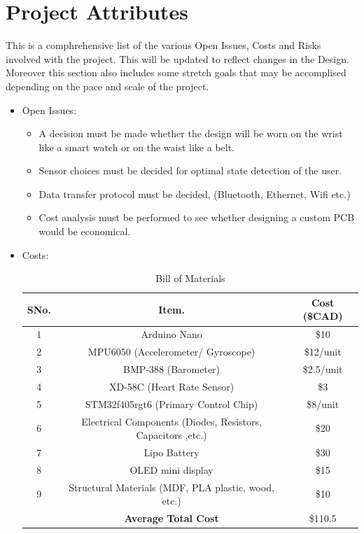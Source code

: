 \documentclass[12pt]{article}
\begin{document}
\section{Project Attributes}
\label{Project_Attr}
This is a comphrehensive list of the various Open Issues, Costs and Risks involved with the project. This will be updated to reflect changes in the Design. Moreover this section also includes some stretch goals that may be accomplised depending on the pace and scale of the project.
\begin{itemize}
\item Open Issues:
	\begin{itemize}
		\item A decision must be made whether the design will be worn on the wrist like a smart watch or on the waist like a belt.
		\item Sensor choices must be decided for optimal state detection of the user.
		\item Data transfer protocol must be decided, (Bluetooth, Ethernet, Wifi etc.)
		\item Cost analysis must be performed to see whether designing a custom PCB would be economical.
	\end{itemize}
	

\item Costs:
		\begin{center}
		\begin{table}[H]
			\begin{tabular}{ |c|c|c| } 
				 \hline
				 	\textbf{SNo.} &  \textbf{Item.} &  \textbf{Cost (\$CAD)} \\ 
				 \hline
				 	1 & Arduino Nano 											& \$10 \\ 
				 \hline		
				 	2 & MPU6050 (Accelerometer/ Gyroscope)						& \$12/unit \\ 
				 \hline
				 	3 & BMP-388 (Barometer) 									& \$2.5/unit \\ 
				 \hline
				 	4 & XD-58C (Heart Rate Sensor)								& \$3\\ 
				 \hline
				 	5 & STM32f405rgt6 (Primary Control Chip) 						& \$8/unit \\ 
				 \hline
				 	6 & Electrical Components (Diodes, Resistors, Capacitors ,etc.) 		& \$20 \\ 
				 \hline
				 	7 & Lipo Battery 											& \$30 \\ 
				 \hline
				 	8 &OLED mini display										& \$15 \\ 
				 \hline
				 	9 & Structural Materials (MDF, PLA plastic, wood, etc.) 			& \$10 \\ 
				 \hline
				 	& \textbf{Average Total Cost}								& \$110.5 \\ 
				 \hline
			\end{tabular}
		\caption{\label{bom}Bill of Materials}  
		\end{table}
		\end{center}


\end{itemize}
\end{document}
